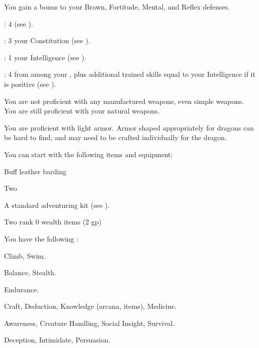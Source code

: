       You gain a  bonus to your Brawn, Fortitude, Mental, and Reflex defenses.

      \begin{raggeditemize}
          \item {}: 4 (see ).
          \item {}: 3 \add your Constitution (see ).
          \item {}: 1 \add your Intelligence (see ).
          \item {}: 4 from among your , plus additional trained skills equal to your Intelligence if it is positive (see ).
      \end{raggeditemize}

      You are not proficient with any manufactured weapons, even simple weapons.
      You are still proficient with your natural weapons.

      You are proficient with light armor.
      Armor shaped appropriately for dragons can be hard to find, and may need to be crafted individually for the dragon.

    You can start with the following items and equipment:

    \begin{raggeditemize}
        \item Buff leather barding
        \item Two 
        \item A standard adventuring kit (see ).
        \item Two rank 0 wealth items (2 gp)
    \end{raggeditemize}

      You have the following :
      \begin{raggeditemize}
        \item {} Climb, Swim.
        \item {} Balance, Stealth.
        \item {} Endurance.
        \item {} Craft, Deduction, Knowledge (arcana, items), Medicine.
        \item {} Awareness, Creature Handling, Social Insight, Survival.
        \item {} Deception, Intimidate, Persuasion.
      \end{raggeditemize}

